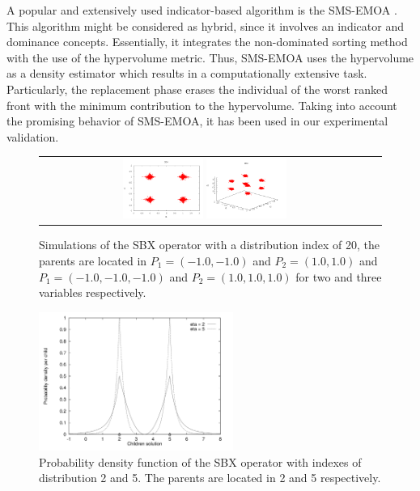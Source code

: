 A popular and extensively used indicator-based algorithm is the SMS-EMOA \cite{Joel:SMSEMOA}.
%
This algorithm might be considered as hybrid, since it involves an indicator and dominance concepts.
%
Essentially, it integrates the non-dominated sorting method with the use of the hypervolume metric.
%
Thus, SMS-EMOA uses the hypervolume as a density estimator which results in a computationally extensive task.
%
Particularly, the replacement phase erases the individual of the worst ranked front with the minimum contribution to the hypervolume.
%
Taking into account the promising behavior of SMS-EMOA, it has been used in our experimental validation.
%
%
\begin{figure}[t]
\centering
\begin{tabular}{cc}
   \includegraphics[width=0.25\textwidth]{img/SBX_eta_20_2D.png} 
   \includegraphics[width=0.25\textwidth]{img/SBX_eta_20_3D.png} 
\end{tabular}
\caption{Simulations of the SBX operator with a distribution index of 20, the parents are located in $P_1=(-1.0, -1.0)$ and $P_2=(1.0, 1.0)$ and $P_1=(-1.0, -1.0, -1.0)$ and $P_2=(1.0, 1.0, 1.0)$ for two and three variables respectively.}
\label{fig:Simulations_Index_20}
\end{figure}

\begin{figure}[!t]
\centering
\includegraphics[width=2.5in]{img/DensitySBX_English.png}
\caption{Probability density function of the SBX operator with indexes of distribution 2 and 5. The parents are located in 2 and 5 respectively.}
\label{fig:fig_sim}
\end{figure}
